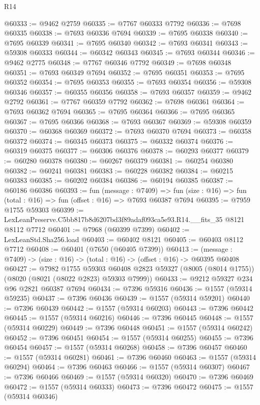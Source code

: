 \begin{lexlean}{R14}
\begin{coremodule}
@60333 := @9462 @2759
@60335 := @7767 @60333 @7792
@60336 := @7698 @60335
@60338 := @7693 @60336 @7694
@60339 := @7695 @60338
@60340 := @7695 @60339
@60341 := @7695 @60340
@60342 := @7693 @60341
@60343 := @59308 @60333
@60344 := @60342 @60343
@60345 := @7693 @60344
@60346 := @9462 @2775
@60348 := @7767 @60346 @7792
@60349 := @7698 @60348
@60351 := @7693 @60349 @7694
@60352 := @7695 @60351
@60353 := @7695 @60352
@60354 := @7695 @60353
@60355 := @7693 @60354
@60356 := @59308 @60346
@60357 := @60355 @60356
@60358 := @7693 @60357
@60359 := @9462 @2792
@60361 := @7767 @60359 @7792
@60362 := @7698 @60361
@60364 := @7693 @60362 @7694
@60365 := @7695 @60364
@60366 := @7695 @60365
@60367 := @7695 @60366
@60368 := @7693 @60367
@60369 := @59308 @60359
@60370 := @60368 @60369
@60372 := @7693 @60370 @7694
@60373 := @60358 @60372
@60374 := @60345 @60373
@60375 := @60332 @60374
@60376 := @60319 @60375
@60377 := @60306 @60376
@60378 := @60293 @60377
@60379 := @60280 @60378
@60380 := @60267 @60379
@60381 := @60254 @60380
@60382 := @60241 @60381
@60383 := @60228 @60382
@60384 := @60215 @60383
@60385 := @60202 @60384
@60386 := @60194 @60385
@60387 := @60186 @60386
@60393 := fun (message : @7409) =>
  fun (size : @16) => fun (total : @16) => fun (offset : @16) => @7693 @60387 @7694
@60395 := @7959 @1755 @59303
@60399 := LexLeanPreserve.C5bb817b8d6207bd3f89adaf093ca5e93.R14.__fits_35 @8121 @8112 @7712
@60401 := @7968 (@60399 @7399)
@60402 := LexLeanStd.Sha256.load
@60403 := @60402 @8121
@60405 := @60403 @8112 @7712
@60408 := @60401 (@7650 (@60405 @7399))
@60413 := (message : @7409) -> (size : @16) -> (total : @16) -> (offset : @16) -> @60395 @60408
@60427 := @7982
    @1755
    @59303
    @60408
    @2823
    @59327
    (@8005 (@8014 @1755))
    (@8020 (@8021 (@8022 @2823) @59303 @7999))
@60433 := @9212 @59327 @234 @96 @2821 @60387 @7694
@60434 := @7396 @59316
@60436 := @1557 (@59314 @59235)
@60437 := @7396 @60436
@60439 := @1557 (@59314 @59201)
@60440 := @7396 @60439
@60442 := @1557 (@59314 @60203)
@60443 := @7396 @60442
@60445 := @1557 (@59314 @60216)
@60446 := @7396 @60445
@60448 := @1557 (@59314 @60229)
@60449 := @7396 @60448
@60451 := @1557 (@59314 @60242)
@60452 := @7396 @60451
@60454 := @1557 (@59314 @60255)
@60455 := @7396 @60454
@60457 := @1557 (@59314 @60268)
@60458 := @7396 @60457
@60460 := @1557 (@59314 @60281)
@60461 := @7396 @60460
@60463 := @1557 (@59314 @60294)
@60464 := @7396 @60463
@60466 := @1557 (@59314 @60307)
@60467 := @7396 @60466
@60469 := @1557 (@59314 @60320)
@60470 := @7396 @60469
@60472 := @1557 (@59314 @60333)
@60473 := @7396 @60472
@60475 := @1557 (@59314 @60346)

\end{coremodule}
\end{lexlean}
